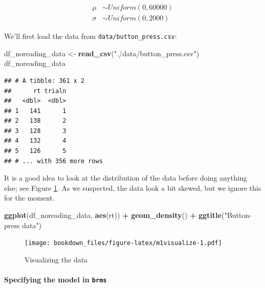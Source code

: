 \documentclass[12pt,]{krantz}
\newenvironment{Shaded}{\begin{snugshade}}{\end{snugshade}}
\newcommand{\KeywordTok}[1]{\textcolor[rgb]{0.13,0.29,0.53}{\textbf{#1}}}
\newcommand{\NormalTok}[1]{#1}
\newcommand{\OperatorTok}[1]{\textcolor[rgb]{0.81,0.36,0.00}{\textbf{#1}}}
\newcommand{\StringTok}[1]{\textcolor[rgb]{0.31,0.60,0.02}{#1}}
\let\oldparagraph\paragraph
\renewcommand{\paragraph}[1]{\oldparagraph{#1}\mbox{}}
\theoremstyle{definition}
\theoremstyle{definition}
\theoremstyle{definition}
\theoremstyle{remark}
\begin{document}
\begin{equation}
\begin{aligned}
\mu &\sim Uniform(0, 60000) \\
\sigma &\sim Uniform(0, 2000) 
\end{aligned}
\label{eq:rtpriors}
\end{equation}

We'll first load the data from \texttt{data/button\_press.csv}:

\begin{Shaded}
\begin{Highlighting}[]
\NormalTok{df_noreading_data <-}\StringTok{ }\KeywordTok{read_csv}\NormalTok{(}\StringTok{"./data/button_press.csv"}\NormalTok{)}
\NormalTok{df_noreading_data}
\end{Highlighting}
\end{Shaded}

\begin{verbatim}
## # A tibble: 361 x 2
##      rt trialn
##   <dbl>  <dbl>
## 1   141      1
## 2   138      2
## 3   128      3
## 4   132      4
## 5   126      5
## # ... with 356 more rows
\end{verbatim}

It is a good idea to look at the distribution of the data before doing anything else; see Figure \ref{fig:m1visualize}. As we suspected, the data look a bit skewed, but we ignore this for the moment.

\begin{Shaded}
\begin{Highlighting}[]
\KeywordTok{ggplot}\NormalTok{(df_noreading_data, }\KeywordTok{aes}\NormalTok{(rt)) }\OperatorTok{+}
\StringTok{  }\KeywordTok{geom_density}\NormalTok{() }\OperatorTok{+}
\StringTok{  }\KeywordTok{ggtitle}\NormalTok{(}\StringTok{"Button-press data"}\NormalTok{)}
\end{Highlighting}
\end{Shaded}

\begin{figure}
\centering
\texttt{[image: bookdown\_files/figure-latex/m1visualize-1.pdf]}
\caption{\label{fig:m1visualize}Visualizing the data}
\end{figure}

\hypertarget{specifying-the-model-in-brms}{%
\paragraph{\texorpdfstring{Specifying the model in \texttt{brms}}{Specifying the model in brms}}\label{specifying-the-model-in-brms}}
\end{document}
